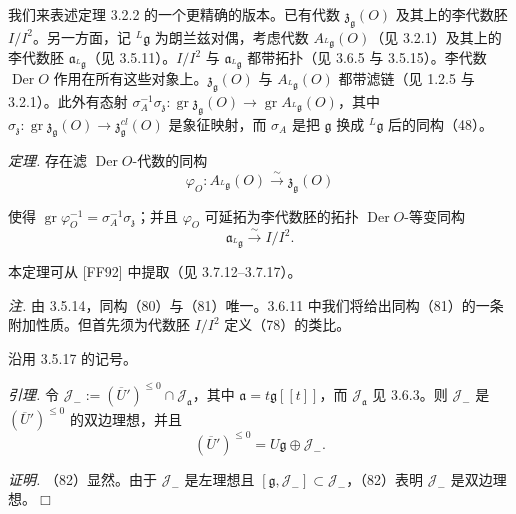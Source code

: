  我们来表述定理 3.2.2 的一个更精确的版本。已有代数 $\mathfrak{z}_{\mathfrak{g}}(O)$ 及其上的李代数胚 $I/I^{2}$。另一方面，记 ${}^{L}\mathfrak{g}$ 为朗兰兹对偶，考虑代数 $A_{{}^{L}\mathfrak{g}}(O)$（见 3.2.1）及其上的李代数胚 $\mathfrak{a}_{{}^{L}\mathfrak{g}}$（见 3.5.11）。$I/I^{2}$ 与 $\mathfrak{a}_{{}^{L}\mathfrak{g}}$ 都带拓扑（见 3.6.5 与 3.5.15）。李代数 $\operatorname{Der} O$ 作用在所有这些对象上。$\mathfrak{z}_{\mathfrak{g}}(O)$ 与 $A_{{}^{L}\mathfrak{g}}(O)$ 都带滤链（见 1.2.5 与 3.2.1）。此外有态射 $\sigma_{A}^{-1}\sigma_{\mathfrak{z}}: \operatorname{gr}\mathfrak{z}_{\mathfrak{g}}(O) \to \operatorname{gr} A_{{}^{L}\mathfrak{g}}(O)$，其中 $\sigma_{\mathfrak{z}}: \operatorname{gr}\mathfrak{z}_{\mathfrak{g}}(O) \to \mathfrak{z}^{cl}_{\mathfrak{g}}(O)$ 是象征映射，而 $\sigma_{A}$ 是把 $\mathfrak{g}$ 换成 ${}^{L}\mathfrak{g}$ 后的同构（48）。

 \emph{定理.} 存在滤 $\operatorname{Der} O$-代数的同构
\begin{equation}\tag{80}
\varphi_{O}: A_{{}^{L}\mathfrak{g}}(O) \xrightarrow{\sim} \mathfrak{z}_{\mathfrak{g}}(O)
\end{equation}

使得 $\operatorname{gr}\varphi_{O}^{-1} = \sigma_{A}^{-1}\sigma_{\mathfrak{z}}$；并且 $\varphi_{O}$ 可延拓为李代数胚的拓扑 $\operatorname{Der} O$-等变同构
\begin{equation}\tag{81}
\mathfrak{a}_{{}^{L}\mathfrak{g}} \xrightarrow{\sim} I/I^{2}.
\end{equation}

本定理可从 [FF92] 中提取（见 3.7.12--3.7.17）。

\emph{注.} 由 3.5.14，同构（80）与（81）唯一。3.6.11 中我们将给出同构（81）的一条附加性质。但首先须为代数胚 $I/I^{2}$ 定义（78）的类比。

 沿用 3.5.17 的记号。

\emph{引理.} 令 $\mathcal{J}_{-} := (\overline{U}')^{\le 0} \cap \mathcal{J}_{\mathfrak{a}}$，其中 $\mathfrak{a} = t\mathfrak{g}[[t]]$，而 $\mathcal{J}_{\mathfrak{a}}$ 见 3.6.3。则 $\mathcal{J}_{-}$ 是 $(\overline{U}')^{\le 0}$ 的双边理想，并且
\begin{equation}\tag{82}
(\overline{U}')^{\le 0} = U\mathfrak{g} \oplus \mathcal{J}_{-}.
\end{equation}

\emph{证明.} （82）显然。由于 $\mathcal{J}_{-}$ 是左理想且 $[\mathfrak{g}, \mathcal{J}_{-}] \subset \mathcal{J}_{-}$，（82）表明 $\mathcal{J}_{-}$ 是双边理想。\hfill$\Box$

